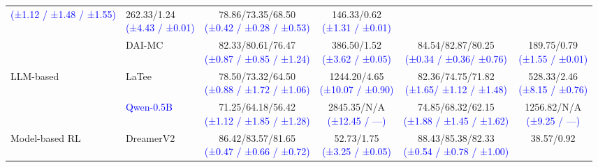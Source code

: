 \documentclass{article} %
\newcommand{\revise}[1]{\textcolor{blue}{#1}}
\begin{document}
\begin{table}[H]
\begin{tabular}{l l c c c c}
{\revise{{\footnotesize (±1.12 / ±1.48 / ±1.55)}}} & \makecell[c]{262.33/1.24\\[-1pt]
\revise{{\footnotesize (±4.43 / ±0.01)}}} & \makecell[c]{78.86/73.35/68.50\\[-1pt]
\revise{{\footnotesize (±0.42 / ±0.28 / ±0.53)}}} & \makecell[c]{146.33/0.62\\[-1pt]
\revise{{\footnotesize (±1.31 / ±0.01)}}} \\
& DAI-MC   & \makecell[c]{82.33/80.61/76.47\\[-1pt]
\revise{{\footnotesize (±0.87 / ±0.85 / ±1.24)}}} & \makecell[c]{386.50/1.52\\[-1pt]
\revise{{\footnotesize (±3.62 / ±0.05)}}} & \makecell[c]{84.54/82.87/80.25\\[-1pt]
\revise{{\footnotesize (±0.34 / ±0.36/ ±0.76)}}} & \makecell[c]{189.75/0.79\\[-1pt]
\revise{{\footnotesize (±1.55 / ±0.01)}}} \\
\multirow{2}{*}{LLM-based}
& LaTee    & \makecell[c]{78.50/73.32/64.50\\[-1pt]
\revise{{\footnotesize (±0.88 / ±1.72 / ±1.06)}}} & \makecell[c]{1244.20/4.65\\[-1pt]
\revise{{\footnotesize (±10.07 / ±0.90)}}} & \makecell[c]{82.36/74.75/71.82\\[-1pt]
\revise{{\footnotesize (±1.65/ ±1.12 / ±1.48)}}} & \makecell[c]{528.33/2.46\\[-1pt]
\revise{{\footnotesize (±8.15 / ±0.76)}}} \\
& \revise{Qwen-0.5B} & \makecell[c]{71.25/64.18/56.42\\[-1pt]
\revise{{\footnotesize (±1.12 / ±1.85 / ±1.28)}}} & \makecell[c]{2845.35/N/A\\[-1pt]
\revise{{\footnotesize (±12.45 / ---)}}} & \makecell[c]{74.85/68.32/62.15\\[-1pt]
\revise{{\footnotesize (±1.88 / ±1.45 / ±1.62)}}} & \makecell[c]{1256.82/N/A\\[-1pt]
\revise{{\footnotesize (±9.25 / ---)}}} \\
Model-based RL & DreamerV2 & \makecell[c]{86.42/83.57/81.65\\[-1pt]
\revise{{\footnotesize (±0.47 / ±0.66 / ±0.72)}}} & \makecell[c]{52.73/1.75\\[-1pt]
\revise{{\footnotesize (±3.25 / ±0.05)}}} & \makecell[c]{88.43/85.38/82.33\\[-1pt]
\revise{{\footnotesize (±0.54 / ±0.78 / ±1.00)}}} & \makecell[c]{38.57/0.92\\[-1pt]
}
\end{tabular}
\end{table}
\end{document}
